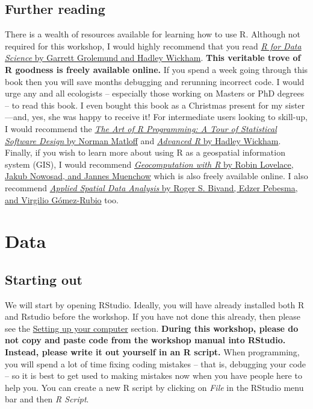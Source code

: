 \documentclass[12pt,]{book}
\begin{document}
\section{Further reading}\label{further-reading}

There is a wealth of resources available for learning how to use R.
Although not required for this workshop, I would highly recommend that
you read \href{https://r4ds.had.co.nz/}{\emph{R for Data Science} by
Garrett Grolemund and Hadley Wickham}. \textbf{This veritable trove of R
goodness is freely available online.} If you spend a week going through
this book then you will save months debugging and rerunning incorrect
code. I would urge any and all ecologists -- especially those working on
Masters or PhD degrees -- to read this book. I even bought this book as
a Christmas present for my sister---and, yes, she was happy to receive
it! For intermediate users looking to skill-up, I would recommend the
\href{http://shop.oreilly.com/product/9781593273842.do}{\emph{The Art of
R Programming: A Tour of Statistical Software Design} by Norman Matloff}
and \href{https://adv-r.hadley.nz/}{\emph{Advanced R} by Hadley
Wickham}. Finally, if you wish to learn more about using R as a
geospatial information system (GIS), I would recommend
\href{https://geocompr.robinlovelace.net/}{\emph{Geocomputation with R}
by Robin Lovelace, Jakub Nowosad, and Jannes Muenchow} which is also
freely available online. I also recommend
\href{https://www.springer.com/gp/book/9781461476177}{\emph{Applied
Spatial Data Analysis} by Roger S. Bivand, Edzer Pebesma, and Virgilio
Gómez-Rubio} too.

\chapter{Data}\label{data}

\section{Starting out}\label{starting-out}

We will start by opening RStudio. Ideally, you will have already
installed both R and Rstudio before the workshop. If you have not done
this already, then please see the \protect\hyperlink{setup}{Setting up
your computer} section. \textbf{During this workshop, please do not copy
and paste code from the workshop manual into RStudio. Instead, please
write it out yourself in an R script.} When programming, you will spend
a lot of time fixing coding mistakes -- that is, debugging your code --
so it is best to get used to making mistakes now when you have people
here to help you. You can create a new R script by clicking on
\emph{File} in the RStudio menu bar and then \emph{R Script}.
\end{document}
